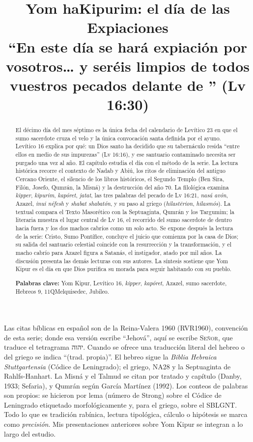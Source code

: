 \documentclass[11pt,letterpaper]{article}
\title{\color{tierraroja}\bfseries Yom haKipurim: el día de las Expiaciones\\[4pt]\large\color{sepia}\mdseries ``En este día se hará expiación por vosotros\ldots{} y seréis limpios de todos vuestros pecados delante de \SENOR'' (Lv 16:30)}
\author{}\date{}
\newcommand{\heb}[1]{\mbox{\foreignlanguage{hebrew}{#1}}}
\newcommand{\SENOR}{\textsc{Señor}}
\begin{document}
\maketitle\thispagestyle{empty}

\begin{abstract}\noindent
El décimo día del mes séptimo es la única fecha del calendario de Levítico 23 en que el sumo sacerdote cruza el velo y la única convocación santa definida por el ayuno. Levítico 16 explica por qué: un Dios santo ha decidido que su tabernáculo resida ``entre ellos en medio de sus impurezas'' (Lv 16:16), y ese santuario contaminado necesita ser purgado una vez al año. El capítulo estudia el día con el método de la serie. La lectura histórica recorre el contexto de Nadab y Abiú, los ritos de eliminación del antiguo Cercano Oriente, el silencio de los libros históricos, el Segundo Templo (Ben Sira, Filón, Josefo, Qumrán, la Misná) y la destrucción del año 70. La filológica examina \emph{kipper}, \emph{kipurim}, \emph{kapóret}, \emph{jatat}, las tres palabras del pecado de Lv 16:21, \emph{nasá avón}, Azazel, \emph{inui néfesh} y \emph{shabat shabatón}, y su paso al griego (\emph{hilastērion}, \emph{hilasmós}). La textual compara el Texto Masorético con la Septuaginta, Qumrán y los Targumim; la literaria muestra el lugar central de Lv 16, el recorrido del sumo sacerdote de dentro hacia fuera y los dos machos cabríos como un solo acto. Se expone después la lectura de la serie: Cristo, Sumo Pontífice, concluye el juicio que comienza por la casa de Dios; su salida del santuario celestial coincide con la resurrección y la transformación, y el macho cabrío para Azazel figura a Satanás, el instigador, atado por mil años. La discusión presenta las demás lecturas con sus autores. La síntesis sostiene que Yom Kipur es el día en que Dios purifica su morada para seguir habitando con su pueblo.
\par\smallskip\noindent\textbf{Palabras clave:} Yom Kipur, Levítico 16, \emph{kipper}, \emph{kapóret}, Azazel, sumo sacerdote, Hebreos 9, 11QMelquisedec, Jubileo.\end{abstract}

\begin{nota}
Las citas bíblicas en español son de la Reina-Valera 1960 (RVR1960), convención de esta serie; donde esa versión escribe ``Jehová'', aquí se escribe \SENOR, que traduce el tetragrama \heb{יהוה}. Cuando se ofrece una traducción literal del hebreo o del griego se indica ``(trad. propia)''. El hebreo sigue la \emph{Biblia Hebraica Stuttgartensia} (Códice de Leningrado); el griego, NA28 y la Septuaginta de Rahlfs-Hanhart. La Misná y el Talmud se citan por tratado y capítulo (Danby, 1933; Sefaria), y Qumrán según García Martínez (1992). Los conteos de palabras son propios: se hicieron por lema (número de Strong) sobre el Códice de Leningrado etiquetado morfológicamente y, para el griego, sobre el SBLGNT. Todo lo que es tradición rabínica, lectura tipológica, cálculo o hipótesis se marca como \emph{precisión}. Mis presentaciones anteriores sobre Yom Kipur se integran a lo largo del estudio.
\end{nota}
\end{document}

